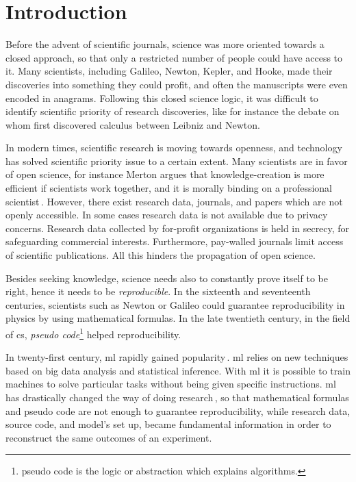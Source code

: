 \section{Introduction}
Before the advent of scientific journals,
science was more oriented towards a closed approach, so that only a restricted number
of people could have access to it.
Many scientists, including Galileo, Newton, Kepler, and Hooke, made their discoveries into
something they could profit, and often the manuscripts were even encoded in anagrams.
Following this closed science logic, it was difficult
to identify scientific priority of research discoveries, like for instance the
debate on whom first discovered calculus between Leibniz and Newton.

In modern times, scientific research is moving towards openness,
and technology has solved scientific priority issue to a certain extent.
Many scientists are in favor of open science, for instance
Merton argues that knowledge-creation is more efficient if scientists work together, and
it is morally binding on a professional scientist\,\cite{merton1942science}.
However, there exist research data, journals, and papers which are not openly accessible.
In some cases research data is not available due to privacy concerns.
Research data collected by for-profit organizations is held in secrecy, for
safeguarding commercial interests.
Furthermore, pay-walled journals limit access of scientific publications.
All this hinders the propagation of open science.

Besides seeking knowledge, science needs also to constantly prove itself
to be right, hence it needs to be \emph{reproducible}. 
In the sixteenth and seventeenth centuries, scientists such as Newton or Galileo could guarantee
reproducibility in physics by using mathematical formulas.
%
In the late twentieth century, in the field of \ac{cs},
\emph{pseudo code}\footnote{pseudo code is the logic or abstraction which explains algorithms.}
helped reproducibility.

In twenty-first century, \ac{ml} rapidly gained popularity\,\cite{mjolsness2001machine}.
\ac{ml} relies on new techniques based on big data analysis and statistical inference.
With \ac{ml} it is possible to train machines to solve particular tasks without being
given specific instructions.
%
\ac{ml} has drastically changed the way of doing research\,\cite{anderson2008end},
so that mathematical formulas and pseudo code are not
enough to guarantee reproducibility, while research data, source code,
and model's set up, became fundamental information in order to reconstruct the
same outcomes of an experiment.


